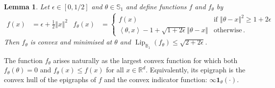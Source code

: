 \documentclass[letter, 12pt]{report}
\newcommand{\R}{\mathbb R}
\newcommand{\ip}[1]{\left \langle #1 \right \rangle}
\newcommand{\sphere}{\mathbb{S}}
\newcommand{\ball}{\mathbb{B}}
\newcommand{\norm}[1]{\left \Vert  #1 \right \Vert}
\newcommand{\lip}{\operatorname{Lip}}
\newcommand{\sind}{\bm{1}}
\newcommand{\1}{\mathbf{1}}
\theoremstyle{plain}
\newtheorem{lemma}[theorem]{Lemma}
\theoremstyle{definition}
\theoremstyle{remark}
\begin{document}
\begin{lemma}\label{lem:f-theta}
    Let $\epsilon \in [0,1/2]$ and $\theta \in \sphere_1$ and define functions $f$ and $f_\theta$ by
    \begin{align*}
        f(x)        & = \epsilon + \frac{1}{2} \norm{x}^2                                                                                 &
        f_\theta(x) & = \begin{cases}
                            f(x)                                                        & \text{if } \norm{\theta - x}^2 \geq 1 + 2 \epsilon \\
                            \ip{\theta, x} - 1 + \sqrt{1 + 2\epsilon} \norm{\theta - x} & \text{otherwise} \,.
                        \end{cases}
    \end{align*}
    Then $f_\theta$ is convex and minimised at $\theta$ and $\lip_{\ball_1}(f_\theta) \leq \sqrt{2 + 2\epsilon}$.
\end{lemma}
The function $f_\theta$ arises naturally as the largest convex function for which both $f_\theta(\theta) = 0$ and $f_\theta(x) \leq f(x)$ for
all $x \in \R^d$.
Equivalently, its epigraph is the convex hull of the epigraphs of $f$ and the convex indicator function: $\infty \sind_\theta(\cdot)$.
\end{document}
